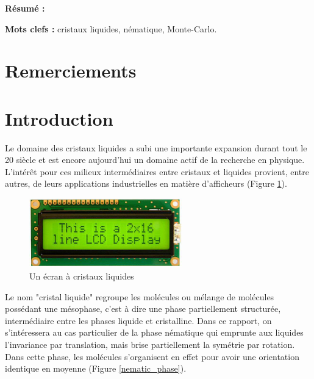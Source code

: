 \documentclass[11pt,a4paper]{article}
\numberwithin{equation}{section}
\begin{document}
\begin{titlepage}
\textbf{Résumé :} 
\vspace{0.3cm}

\textbf{Mots clefs :} cristaux liquides, nématique, Monte-Carlo.
\vspace{0.3cm}


\end{titlepage}

\newpage


\section*{Remerciements}




\tableofcontents


\newpage
\renewcommand\thepage{\arabic{page}}



\section*{Introduction}
Le domaine des cristaux liquides a subi une importante expansion durant tout le 20 siècle et est encore aujourd'hui un domaine actif de la recherche en physique. L'intérêt pour ces milieux intermédiaires entre cristaux et liquides provient, entre autres, de leurs applications industrielles en matière d'afficheurs (Figure \ref{lcd}).

\begin{figure}[h]
    \centering	    
	\includegraphics[height=3cm]{figures/lcd.jpg}
    \caption{Un écran à cristaux liquides}
    	\label{lcd} 
\end{figure}

Le nom "cristal liquide" regroupe les molécules ou mélange de molécules possédant une mésophase, c'est à dire une phase partiellement structurée, intermédiaire entre les phases liquide et cristalline. Dans ce rapport, on s'intéressera au cas particulier de la phase nématique qui emprunte aux liquides l'invariance par translation, mais brise partiellement la symétrie par rotation. Dans cette phase, les molécules s'organisent en effet pour avoir une orientation identique en moyenne (Figure \ref{nematic_phase}).
\end{document}
